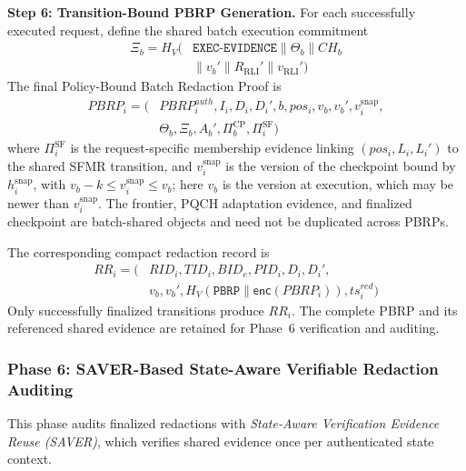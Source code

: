 \documentclass[lettersize,journal]{IEEEtran}
\begin{document}
\medskip
\noindent\textbf{Step 6: Transition-Bound PBRP Generation.}
For each successfully executed request, define the shared batch
execution commitment
\begin{equation}
\begin{aligned}
\Xi_b=
H_V\big(&\texttt{EXEC-EVIDENCE}\parallel
\Theta_b\parallel CH_b\\
&\parallel v_b'\parallel
R_{\mathrm{RLI}}'\parallel v_{\mathrm{RLI}}'\big)
\end{aligned}
\label{eq:xi}
\end{equation}
The final Policy-Bound Batch Redaction Proof is
\begin{equation}
\begin{aligned}
PBRP_i=\big(
&PBRP_i^{auth},I_i,D_i,D_i',
b,pos_i,v_b,v_b',v_i^{\mathrm{snap}},\\
&\Theta_b,\Xi_b,A_b',\Pi_b^{\mathrm{CP}},\Pi_i^{\mathrm{SF}}\big)
\end{aligned}
\label{eq:pbrp}
\end{equation}
where $\Pi_i^{\mathrm{SF}}$ is the request-specific membership evidence
linking $(pos_i,L_i,L_i')$ to the shared SFMR transition,
and $v_i^{\mathrm{snap}}$ is the version of the checkpoint bound by
$h_i^{\mathrm{snap}}$, with $v_b-k\le v_i^{\mathrm{snap}}\le v_b$; here
$v_b$ is the version at execution, which may be newer than
$v_i^{\mathrm{snap}}$. The frontier,
PQCH adaptation evidence, and finalized checkpoint are batch-shared
objects and need not be duplicated across PBRPs.

The corresponding compact redaction record is
\begin{equation}
\begin{aligned}
RR_i=\big(
&RID_i,TID_i,BID_e,PID_i,D_i,D_i',\\
&v_b,v_b',H_V(\texttt{PBRP}\parallel
\mathsf{enc}(PBRP_i)),ts_i^{red}\big)
\end{aligned}
\end{equation}
Only successfully finalized transitions produce $RR_i$. The complete
PBRP and its referenced shared evidence are retained for Phase~6
verification and auditing.


\subsubsection*{\textbf{Phase 6: SAVER-Based State-Aware
Verifiable Redaction Auditing}}

This phase audits finalized redactions with \emph{State-Aware
Verification Evidence Reuse (SAVER)}, which verifies shared evidence once
per authenticated state context.
\end{document}
